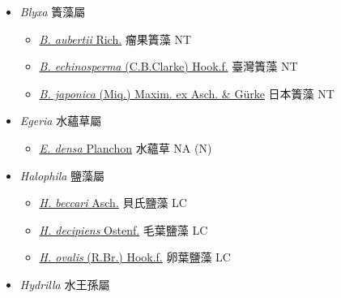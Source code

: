 
  \begin{itemize}
 \item[] \textit{Blyxa} 簀藻屬
                                
  \begin{itemize}
        \item[] \href{http://www.theplantlist.org/tpl1.1/search?q=Blyxa+aubertii}{\textit{B. aubertii} Rich.}   瘤果簀藻   NT
        \item[] \href{http://www.theplantlist.org/tpl1.1/search?q=Blyxa+echinosperma}{\textit{B. echinosperma} (C.B.Clarke) Hook.f.}   臺灣簀藻   NT
        \item[] \href{http://www.theplantlist.org/tpl1.1/search?q=Blyxa+japonica}{\textit{B. japonica} (Miq.) Maxim. ex Asch. \& Gürke}   日本簀藻   NT
  \end{itemize}
 \item[] \textit{Egeria} 水蘊草屬
                                
  \begin{itemize}
        \item[] \href{http://www.theplantlist.org/tpl1.1/search?q=Egeria+densa}{\textit{E. densa} Planchon}   水蘊草   NA (N)
  \end{itemize}
 \item[] \textit{Halophila} 鹽藻屬
                                
  \begin{itemize}
        \item[] \href{http://www.theplantlist.org/tpl1.1/search?q=Halophila+beccari}{\textit{H. beccari} Asch.}   貝氏鹽藻   LC
        \item[] \href{http://www.theplantlist.org/tpl1.1/search?q=Halophila+decipiens}{\textit{H. decipiens} Ostenf.}   毛葉鹽藻   LC
        \item[] \href{http://www.theplantlist.org/tpl1.1/search?q=Halophila+ovalis}{\textit{H. ovalis} (R.Br.) Hook.f.}   卵葉鹽藻   LC
  \end{itemize}
 \item[] \textit{Hydrilla} 水王孫屬
                                

\end{itemize}
